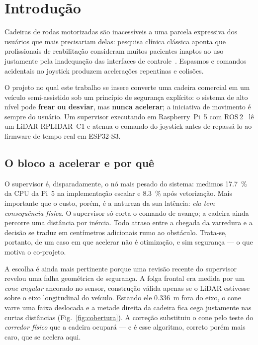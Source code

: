 \documentclass[conference]{IEEEtran}
\begin{document}
\section{Introdu\c{c}\~ao}

Cadeiras de rodas motorizadas s\~ao inacess\'iveis a uma parcela expressiva dos
usu\'arios que mais precisariam delas: pesquisa cl\'inica cl\'assica aponta que
profissionais de reabilita\c{c}\~ao consideram muitos pacientes inaptos ao uso
justamente pela inadequa\c{c}\~ao das interfaces de controle~\cite{fehr2000}.
Espasmos e comandos acidentais no joystick produzem acelera\c{c}\~oes repentinas
e colis\~oes.

O projeto no qual este trabalho se insere converte uma cadeira comercial em um
ve\'iculo semi-assistido sob um princ\'ipio de seguran\c{c}a expl\'icito: o
sistema de alto n\'ivel pode \textbf{frear ou desviar}, mas \textbf{nunca
acelerar}; a iniciativa de movimento \'e sempre do usu\'ario. Um supervisor
executando em Raspberry~Pi~5 com ROS\,2~\cite{ros2docs} l\^e um LiDAR RPLIDAR~C1 e
atenua o comando do joystick antes de repass\'a-lo ao firmware de tempo real em
ESP32-S3.

\subsection{O bloco a acelerar e por qu\^e}

O supervisor \'e, disparadamente, o n\'o mais pesado do sistema: medimos
\SI{17.7}{\percent} da CPU da Pi~5 na implementa\c{c}\~ao escalar e
\SI{8.3}{\percent} ap\'os vetoriza\c{c}\~ao. Mais importante que o custo, por\'em,
\'e a natureza da sua lat\^encia: \emph{ela tem consequ\^encia f\'isica}. O
supervisor s\'o corta o comando de avan\c{c}o; a cadeira ainda percorre uma
dist\^ancia por in\'ercia. Todo atraso entre a chegada da varredura e a decis\~ao
se traduz em cent\'imetros adicionais rumo ao obst\'aculo. Trata-se, portanto, de
um caso em que acelerar n\~ao \'e otimiza\c{c}\~ao, e sim seguran\c{c}a --- o que
motiva o co-projeto.

A escolha \'e ainda mais pertinente porque uma revis\~ao recente do supervisor
revelou uma falha geom\'etrica de seguran\c{c}a. A folga frontal era medida por um
\emph{cone angular} ancorado no sensor, constru\c{c}\~ao v\'alida apenas se o
LiDAR estivesse sobre o eixo longitudinal do ve\'iculo. Estando ele
\SI{0.336}{\metre} fora do eixo, o cone varre uma faixa deslocada e a metade
direita da cadeira fica cega justamente nas curtas dist\^ancias
(Fig.~\ref{fig:cobertura}). A corre\c{c}\~ao substituiu o cone pelo teste do
\emph{corredor f\'isico} que a cadeira ocupar\'a --- e \'e esse algoritmo,
correto por\'em mais caro, que se acelera aqui.
\end{document}
